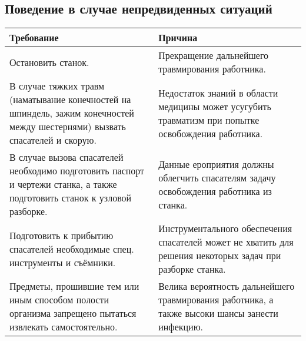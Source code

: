 \documentclass[a4paper,
	twoside,
	russian]{article}
\begin{document}
\clearpage
\subsection{Поведение в случае непредвиденных ситуаций}
\begin{tabulary}{\linewidth}{LL}
\textbf{Требование} & \textbf{Причина} \\ \hline
Остановить станок.
&
Прекращение дальнейшего травмирования работника.
\\ \hline
В случае тяжких травм (наматывание конечностей на шпиндель, зажим
конечностей между шестернями) вызвать спасателей и скорую.
&
Недостаток знаний в области медицины может усугубить травматизм при
попытке освобождения работника.
\\ \hline
В случае вызова спасателей необходимо подготовить паспорт и чертежи
станка, а также подготовить станок к узловой разборке.
&
Данные ероприятия должны облегчить спасателям задачу освобождения
работника из станка.
\\ \hline
Подготовить к прибытию спасателей необходимые спец. инструменты и
съёмники.
&
Инструментального обеспечения спасателей может не хватить для решения
некоторых задач при разборке станка.
\\ \hline
Предметы, прошившие тем или иным способом полости организма запрещено
пытаться извлекать самостоятельно.
&
Велика вероятность дальнейшего травмирования работника, а также
высоки шансы занести инфекцию.
\\ \hline
\end{tabulary}
\end{document}
